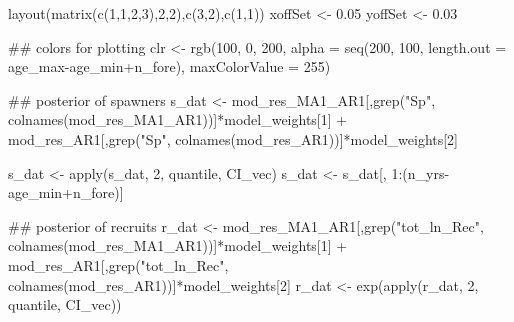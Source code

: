 \documentclass[
  11pt,
]{article}
\newenvironment{Shaded}{}{}
\newcommand{\CommentTok}[1]{\textcolor[rgb]{0.00,0.50,0.00}{#1}}
\newcommand{\DataTypeTok}[1]{#1}
\newcommand{\DecValTok}[1]{#1}
\newcommand{\FloatTok}[1]{#1}
\newcommand{\KeywordTok}[1]{\textcolor[rgb]{0.00,0.00,1.00}{#1}}
\newcommand{\NormalTok}[1]{#1}
\newcommand{\OperatorTok}[1]{#1}
\newcommand{\StringTok}[1]{\textcolor[rgb]{0.00,0.50,0.50}{#1}}
\begin{document}
\begin{Shaded}
\begin{Highlighting}[]
\KeywordTok{layout}\NormalTok{(}\KeywordTok{matrix}\NormalTok{(}\KeywordTok{c}\NormalTok{(}\DecValTok{1}\NormalTok{,}\DecValTok{1}\NormalTok{,}\DecValTok{2}\NormalTok{,}\DecValTok{3}\NormalTok{),}\DecValTok{2}\NormalTok{,}\DecValTok{2}\NormalTok{),}\KeywordTok{c}\NormalTok{(}\DecValTok{3}\NormalTok{,}\DecValTok{2}\NormalTok{),}\KeywordTok{c}\NormalTok{(}\DecValTok{1}\NormalTok{,}\DecValTok{1}\NormalTok{))}
\NormalTok{xoffSet <-}\StringTok{ }\FloatTok{0.05}
\NormalTok{yoffSet <-}\StringTok{ }\FloatTok{0.03}

\CommentTok{## colors for plotting}
\NormalTok{clr <-}\StringTok{ }\KeywordTok{rgb}\NormalTok{(}\DecValTok{100}\NormalTok{, }\DecValTok{0}\NormalTok{, }\DecValTok{200}\NormalTok{,}
           \DataTypeTok{alpha =} \KeywordTok{seq}\NormalTok{(}\DecValTok{200}\NormalTok{, }\DecValTok{100}\NormalTok{,}
                       \DataTypeTok{length.out =}\NormalTok{ age_max}\OperatorTok{-}\NormalTok{age_min}\OperatorTok{+}\NormalTok{n_fore),}
           \DataTypeTok{maxColorValue =} \DecValTok{255}\NormalTok{)}

\CommentTok{## posterior of spawners}
\NormalTok{s_dat <-}\StringTok{ }\NormalTok{mod_res_MA1_AR1[,}\KeywordTok{grep}\NormalTok{(}\StringTok{"Sp"}\NormalTok{, }\KeywordTok{colnames}\NormalTok{(mod_res_MA1_AR1))]}\OperatorTok{*}\NormalTok{model_weights[}\DecValTok{1}\NormalTok{] }\OperatorTok{+}\StringTok{ }\NormalTok{mod_res_AR1[,}\KeywordTok{grep}\NormalTok{(}\StringTok{"Sp"}\NormalTok{, }\KeywordTok{colnames}\NormalTok{(mod_res_AR1))]}\OperatorTok{*}\NormalTok{model_weights[}\DecValTok{2}\NormalTok{]  }

\NormalTok{s_dat <-}\StringTok{ }\KeywordTok{apply}\NormalTok{(s_dat, }\DecValTok{2}\NormalTok{, quantile, CI_vec)}
\NormalTok{s_dat <-}\StringTok{ }\NormalTok{s_dat[, }\DecValTok{1}\OperatorTok{:}\NormalTok{(n_yrs}\OperatorTok{-}\NormalTok{age_min}\OperatorTok{+}\NormalTok{n_fore)]}

\CommentTok{## posterior of recruits}
\NormalTok{r_dat <-}\StringTok{ }\NormalTok{mod_res_MA1_AR1[,}\KeywordTok{grep}\NormalTok{(}\StringTok{"tot_ln_Rec"}\NormalTok{, }\KeywordTok{colnames}\NormalTok{(mod_res_MA1_AR1))]}\OperatorTok{*}\NormalTok{model_weights[}\DecValTok{1}\NormalTok{] }\OperatorTok{+}\StringTok{ }\NormalTok{mod_res_AR1[,}\KeywordTok{grep}\NormalTok{(}\StringTok{"tot_ln_Rec"}\NormalTok{, }\KeywordTok{colnames}\NormalTok{(mod_res_AR1))]}\OperatorTok{*}\NormalTok{model_weights[}\DecValTok{2}\NormalTok{]  }
\NormalTok{r_dat <-}\StringTok{ }\KeywordTok{exp}\NormalTok{(}\KeywordTok{apply}\NormalTok{(r_dat, }\DecValTok{2}\NormalTok{, quantile, CI_vec))}


\end{Highlighting}
\end{Shaded}
\end{document}

